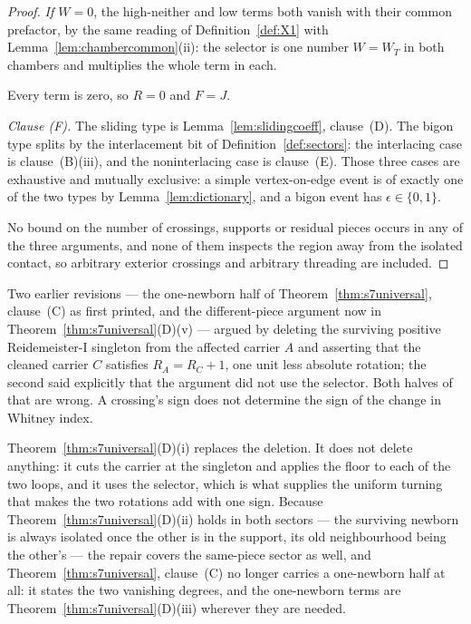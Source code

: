 \begin{proof}
\emph{If $W=0$}, the high-neither and low terms both vanish with their common
prefactor, by the same reading of Definition~\ref{def:X1} with
Lemma~\ref{lem:chambercommon}(ii): the selector is one number $W=W_T$ in both
chambers and multiplies the whole term in each.

Every term is zero, so $R=0$ and $F=J$.

\emph{Clause (F).} The sliding type is Lemma~\ref{lem:slidingcoeff}, clause~(D). The bigon type splits by the
interlacement bit of Definition~\ref{def:sectors}: the interlacing case is
clause~(B)(iii), and the noninterlacing case is
clause~(E). Those three cases are exhaustive and mutually
exclusive: a simple vertex-on-edge event is of exactly one of the two types by
Lemma~\ref{lem:dictionary}, and a bigon event has $\epsilon\in\{0,1\}$.

No bound on the number of crossings, supports or residual pieces occurs in any
of the three arguments, and none of them inspects the region away from the
isolated contact, so arbitrary exterior crossings and arbitrary threading are
included.
\end{proof}

\begin{remark}\label{rem:kinkdeletion}
Two earlier revisions --- the one-newborn half of
Theorem~\ref{thm:s7universal}, clause~(C) as first printed, and the different-piece argument
now in Theorem~\ref{thm:s7universal}(D)(v) --- argued by deleting the
surviving positive Reidemeister-I singleton from the affected carrier $A$ and
asserting that the cleaned carrier $C$ satisfies $R_A=R_C+1$, one unit less
absolute rotation; the second said explicitly that the argument did not use the
selector. Both halves of that are wrong. A crossing's sign does not determine
the sign of the change in Whitney index.

Theorem~\ref{thm:s7universal}(D)(i) replaces the deletion. It does not delete
anything: it cuts the carrier at the singleton and applies the floor to each of
the two loops, and it uses the selector, which is what supplies the uniform
turning that makes the two rotations add with one sign. Because
Theorem~\ref{thm:s7universal}(D)(ii) holds in both sectors --- the surviving
newborn is always isolated once the other is in the support, its old
neighbourhood being the other's --- the repair covers the same-piece sector as well, and
Theorem~\ref{thm:s7universal}, clause~(C) no longer carries a one-newborn half at all: it
states the two vanishing degrees, and the one-newborn terms are
Theorem~\ref{thm:s7universal}(D)(iii) wherever they are needed.
\end{remark}

